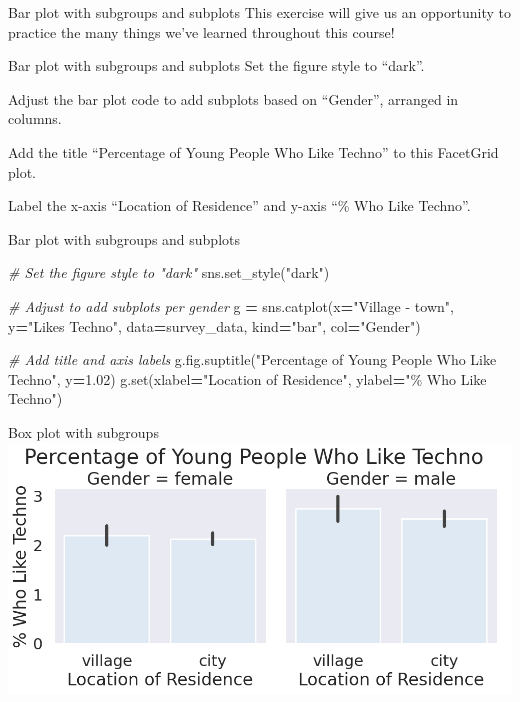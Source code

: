 \documentclass[
  ignorenonframetext,
]{beamer}
\newenvironment{Shaded}{\begin{snugshade}}{\end{snugshade}}
\newcommand{\BuiltInTok}[1]{#1}
\newcommand{\CommentTok}[1]{\textcolor[rgb]{0.56,0.35,0.01}{\textit{#1}}}
\newcommand{\FloatTok}[1]{\textcolor[rgb]{0.00,0.00,0.81}{#1}}
\newcommand{\NormalTok}[1]{#1}
\newcommand{\OperatorTok}[1]{\textcolor[rgb]{0.81,0.36,0.00}{\textbf{#1}}}
\newcommand{\StringTok}[1]{\textcolor[rgb]{0.31,0.60,0.02}{#1}}
\begin{document}
\begin{frame}{Bar plot with subgroups and subplots}
\label{bar-plot-with-subgroups-and-subplots-1}
This exercise will give us an opportunity to practice the many things
we've learned throughout this course!
\end{frame}

\begin{frame}{Bar plot with subgroups and subplots}
\label{bar-plot-with-subgroups-and-subplots-2}
Set the figure style to ``dark''.

Adjust the bar plot code to add subplots based on ``Gender'', arranged
in columns.

Add the title ``Percentage of Young People Who Like Techno'' to this
FacetGrid plot.

Label the x-axis ``Location of Residence'' and y-axis ``\% Who Like
Techno''.
\end{frame}

\begin{frame}[fragile]{Bar plot with subgroups and subplots}
\label{bar-plot-with-subgroups-and-subplots-3}

\begin{Shaded}
\begin{Highlighting}[]
\CommentTok{\# Set the figure style to "dark"}
\NormalTok{sns.set\_style(}\StringTok{"dark"}\NormalTok{)}

\CommentTok{\# Adjust to add subplots per gender}
\NormalTok{g }\OperatorTok{=}\NormalTok{ sns.catplot(x}\OperatorTok{=}\StringTok{"Village {-} town"}\NormalTok{, y}\OperatorTok{=}\StringTok{"Likes Techno"}\NormalTok{, }
\NormalTok{                data}\OperatorTok{=}\NormalTok{survey\_data, kind}\OperatorTok{=}\StringTok{"bar"}\NormalTok{,}
\NormalTok{                col}\OperatorTok{=}\StringTok{"Gender"}\NormalTok{)}

\CommentTok{\# Add title and axis labels}
\NormalTok{g.fig.suptitle(}\StringTok{"Percentage of Young People Who Like Techno"}\NormalTok{, y}\OperatorTok{=}\FloatTok{1.02}\NormalTok{)}
\NormalTok{g.}\BuiltInTok{set}\NormalTok{(xlabel}\OperatorTok{=}\StringTok{"Location of Residence"}\NormalTok{, }
\NormalTok{      ylabel}\OperatorTok{=}\StringTok{"\% Who Like Techno"}\NormalTok{)}
\end{Highlighting}
\end{Shaded}
\end{frame}

\begin{frame}{Box plot with subgroups}
\label{box-plot-with-subgroups-10}
\includegraphics{../images/im311.png}
\end{frame}
\end{document}
